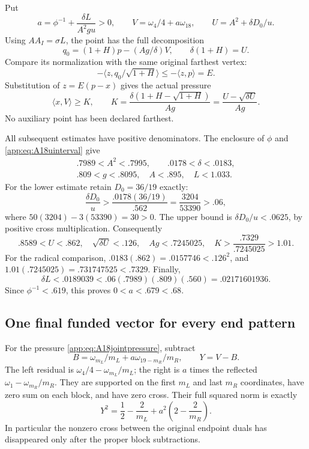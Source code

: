 \documentclass[11pt]{article}
\theoremstyle{definition}
\theoremstyle{remark}
\newcommand{\ip}[2]{\langle #1,#2\rangle}
\begin{document}
Put
\[
 a=\phi^{-1}+\frac{\delta L}{A^2gu}>0,\qquad
 V=\omega_4/4+a\omega_{18},\qquad
 U=A^2+\delta D_0/u .
\]
Using \(AA_I=\sigma L\), the point has the full decomposition
\[
 q_0=(1+H)p-(Ag/\delta)V,\qquad
 \delta(1+H)=U.
\]
Compare its normalization with the same original farthest vertex:
\[
 -\ip z{q_0/\sqrt{1+H}}\leq-\ip zp=E .
\]
Substitution of \(z=E(p-x)\) gives the actual pressure
\begin{equation}\label{app:eq:A18jointpressure}
 \ip xV\geq K,\qquad
 K=\frac{\delta(1+H-\sqrt{1+H})}{Ag}
   =\frac{U-\sqrt{\delta U}}{Ag}.
\end{equation}
No auxiliary point has been declared farthest.

All subsequent estimates have positive denominators. The enclosure
of \(\phi\) and \eqref{app:eq:A18uinterval} give
\[
\begin{gathered}
 .7989<A^2<.7995,\qquad .0178<\delta<.0183,\\
 .809<g<.8095,\quad A<.895,\quad L<1.033 .
\end{gathered}
\]
For the lower estimate retain \(D_0=36/19\) exactly:
\[
 \frac{\delta D_0}{u}
  >\frac{.0178(36/19)}{.562}
   =\frac{3204}{53390}>.06 ,
\]
where \(50(3204)-3(53390)=30>0\).
The upper bound is \(\delta D_0/u<.0625\), by positive
cross multiplication. Consequently
\[
 .8589<U<.862,\quad
 \sqrt{\delta U}<.126,\quad
 Ag<.7245025,\quad
 K>\frac{.7329}{.7245025}>1.01 .
\]
For the radical comparison,
\(.0183(.862)=.0157746<.126^2\), and
\(1.01(.7245025)=.731747525<.7329\).
Finally,
\[
 \delta L<.0189039
 <.06(.7989)(.809)(.560)=.02171601936 .
\]
Since \(\phi^{-1}<.619\), this proves \(0<a<.679<.68\).

\subsection{One final funded vector for every end pattern}
\label{app:A18lastpayment}
For the pressure \eqref{app:eq:A18jointpressure}, subtract
\[
 B=\omega_{m_L}/m_L+a\omega_{19-m_R}/m_R,\qquad Y=V-B.
\]
The left residual is \(\omega_4/4-\omega_{m_L}/m_L\);
the right is \(a\) times the reflected
\(\omega_1-\omega_{m_R}/m_R\).
They are supported on the first \(m_L\) and last \(m_R\)
coordinates, have zero sum on each block, and have zero cross.
Their full squared norm is exactly
\[
 Y^2=\frac12-\frac2{m_L}
          +a^2\left(2-\frac2{m_R}\right).
\]
In particular the nonzero cross between the original endpoint
duals has disappeared only after the proper block subtractions.
\end{document}
